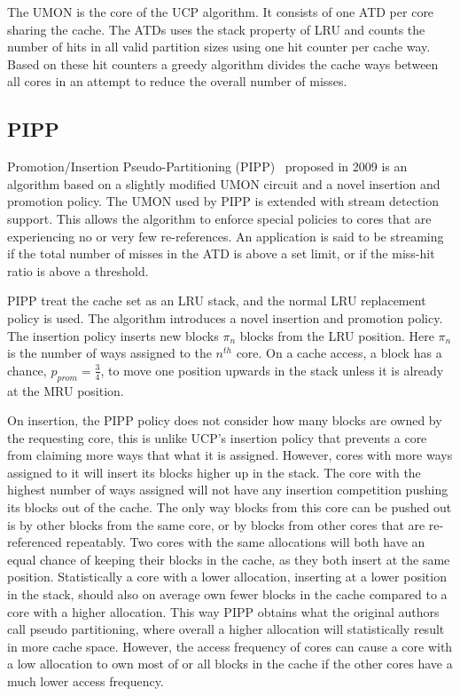 The UMON is the core of the UCP algorithm.
It consists of one ATD per core sharing the cache. 
The ATDs uses the stack property of LRU and counts the number of hits in all valid partition sizes using one hit counter per cache way.
Based on these hit counters a greedy algorithm divides the cache ways between all cores in an attempt to reduce the overall number of misses.

\subsection{PIPP}

Promotion/Insertion Pseudo-Partitioning (PIPP)~\cite{Xie2009} proposed in 2009 is an algorithm based on a slightly modified UMON circuit and a novel insertion and promotion policy.
The UMON used by PIPP is extended with stream detection support.
This allows the algorithm to enforce special policies to cores that are experiencing no or very few re-references.
An application is said to be streaming if the total number of misses in the ATD is above a set limit, or if the miss-hit ratio is above a threshold.

PIPP treat the cache set as an LRU stack, and the normal LRU replacement policy is used.
The algorithm introduces a novel insertion and promotion policy.
The insertion policy inserts new blocks $\pi_n$ blocks from the LRU position. 
Here $\pi_n$ is the number of ways assigned to the $n^{th}$ core.
On a cache access, a block has a chance, $p_{prom} = \frac{3}{4}$, to move one position upwards in the stack unless it is already at the MRU position.

On insertion, the PIPP policy does not consider how many blocks are owned by the requesting core, this is unlike UCP's insertion policy that prevents a core from claiming more ways that what it is assigned.
However, cores with more ways assigned to it will insert its blocks higher up in the stack. 
The core with the highest number of ways assigned will not have any insertion competition pushing its blocks out of the cache.
The only way blocks from this core can be pushed out is by other blocks from the same core, or by blocks from other cores that are re-referenced repeatably.
Two cores with the same allocations will both have an equal chance of keeping their blocks in the cache, as they both insert at the same position.
Statistically a core with a lower allocation, inserting at a lower position in the stack, should also on average own fewer blocks in the cache compared to a core with a higher allocation.
This way PIPP obtains what the original authors call pseudo partitioning, where overall a higher allocation will statistically result in more cache space.
However, the access frequency of cores can cause a core with a low allocation to own most of or all blocks in the cache if the other cores have a much lower access frequency.

